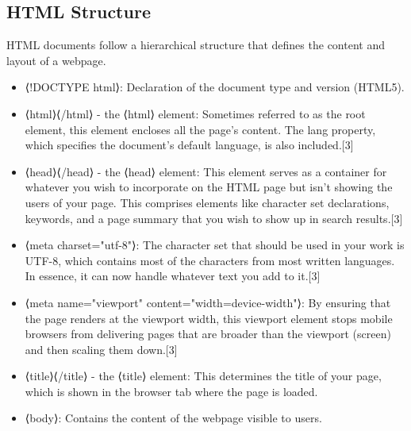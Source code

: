 \subsection*{HTML Structure}  HTML documents follow a hierarchical structure that defines the content and layout
of a webpage. 
\begin{itemize}
	\item ⟨!DOCTYPE html⟩: Declaration of the document type and version (HTML5).
\end{itemize}
\begin{itemize}
	\item ⟨html⟩⟨/html⟩ - the ⟨html⟩ element: Sometimes referred to as the root element, this element encloses all the page's content. The lang property, which specifies the document's default language, is also included.[3]
\end{itemize}
\begin{itemize}
	\item ⟨head⟩⟨/head⟩ - the ⟨head⟩ element: This element serves as a container for whatever you wish to incorporate on the HTML page but isn't showing the users of your page. This comprises elements like character set declarations, keywords, and a page summary that you wish to show up in search results.[3]
\end{itemize}
\begin{itemize}
	\item ⟨meta charset="utf-8"⟩: The character set that should be used in your work is UTF-8, which contains most of the characters from most written languages. In essence, it can now handle whatever text you add to it.[3] 
\end{itemize}
\begin{itemize}
	\item ⟨meta name="viewport" content="width=device-width"⟩: By ensuring that the page renders at the viewport width, this viewport element stops mobile browsers from delivering pages that are broader than the viewport (screen) and then scaling them down.[3]
\end{itemize}
\begin{itemize}
	\item ⟨title⟩⟨/title⟩ - the ⟨title⟩ element: This determines the title of your page, which is shown in the browser tab where the page is loaded.
\end{itemize}
\begin{itemize}
	\item ⟨body⟩: Contains the content of the webpage visible to users.
\end{itemize}
